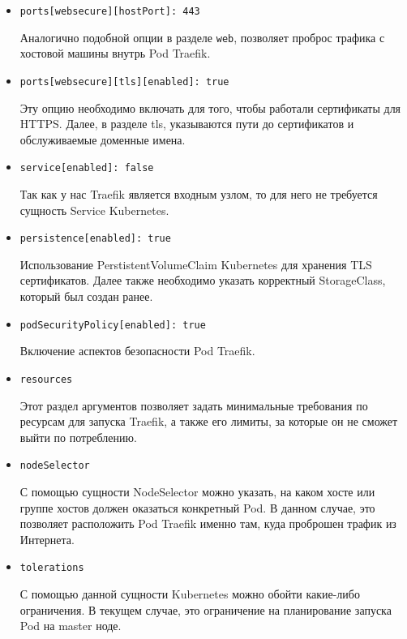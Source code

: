 \begin{itemize}
    \item \texttt{ports[websecure][hostPort]: 443}

        Аналогично подобной опции в разделе \texttt{web}, позволяет проброс трафика с хостовой машины внутрь Pod Traefik.

    \item \texttt{ports[websecure][tls][enabled]: true}

        Эту опцию необходимо включать для того, чтобы работали сертификаты для HTTPS. Далее, в разделе tls,
        указываются пути до сертификатов и обслуживаемые доменные имена.

    \item \texttt{service[enabled]: false}

        Так как у нас Traefik является входным узлом, то для него не требуется сущность Service
        Kubernetes.

    \item \texttt{persistence[enabled]: true}

        Использование PerstistentVolumeClaim Kubernetes для хранения TLS сертификатов. Далее также необходимо указать корректный StorageClass, который был создан ранее.

    \item \texttt{podSecurityPolicy[enabled]: true}

        Включение аспектов безопасности Pod Traefik.

    \item \texttt{resources}

        Этот раздел аргументов позволяет задать минимальные требования по ресурсам для запуска Traefik, а также его лимиты, за которые он не сможет выйти по потреблению.

    \item \texttt{nodeSelector}

        С помощью сущности NodeSelector
        можно указать, на каком хосте или группе хостов должен оказаться конкретный Pod. В данном случае, это позволяет расположить Pod Traefik именно там, куда проброшен трафик из Интернета.

    \item \texttt{tolerations}

        С помощью данной сущности Kubernetes можно обойти какие-либо ограничения. В текущем случае, это ограничение на планирование запуска Pod на master ноде.

\end{itemize}
